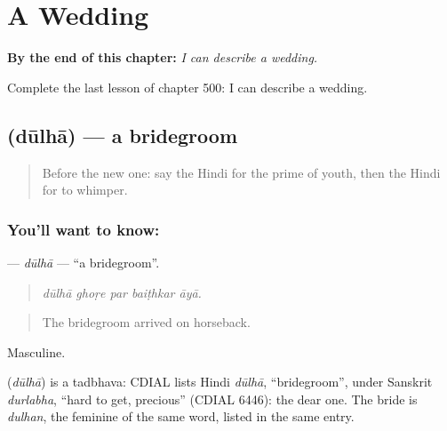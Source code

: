
\chapter{A Wedding}
\label{ch:hi-a-wedding}

\begin{chapteropening}
\textbf{By the end of this chapter:} \emph{I can describe a wedding.}

Complete the last lesson of chapter 500: I can describe a wedding.
\end{chapteropening}

\section[\texorpdfstring{\hi{दूल्हा} (dūlhā)}{दूल्हा (dūlhā)}]{ (dūlhā) — a bridegroom}

\label{lesson:HI-C500-dulha}



\begin{quote}
Before the new one: say the Hindi for the prime of youth, then the Hindi for to whimper.
\end{quote}

\subsection*{You'll want to know: }
\textbf{} — \emph{dūlhā} — \textquotedblleft{}a bridegroom\textquotedblright{}.

\begin{quote}
    
\end{quote}

\begin{quote}
\emph{dūlhā ghoṛe par baiṭhkar āyā.}
\end{quote}

\begin{quote}
The bridegroom arrived on horseback.
\end{quote}

Masculine.

\begin{cousinweb}
\textbf{} (\emph{dūlhā}) is a tadbhava: CDIAL lists Hindi \emph{dūlhā}, \textquotedblleft{}bridegroom\textquotedblright{}, under Sanskrit \emph{durlabha}, \textquotedblleft{}hard to get, precious\textquotedblright{} (CDIAL 6446): the dear one. The bride is \emph{dulhan}, the feminine of the same word, listed in the same entry.
\end{cousinweb}

